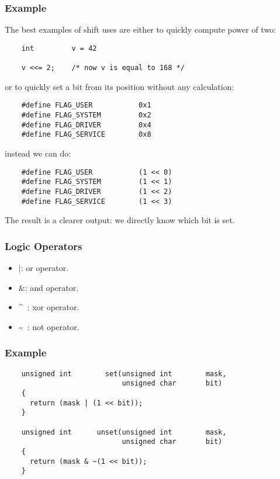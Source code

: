
\begin{frame}[containsverbatim]
  \frametitle{Example}

  The best examples of shift uses are either to quickly compute power of two:

  \begin{verbatim}
    int         v = 42

    v <<= 2;    /* now v is equal to 168 */
  \end{verbatim}

  or to quickly set a bit from its position without any calculation:

  \begin{verbatim}
    #define FLAG_USER           0x1
    #define FLAG_SYSTEM         0x2
    #define FLAG_DRIVER         0x4
    #define FLAG_SERVICE        0x8
  \end{verbatim}

  instead we can do:

  \begin{verbatim}
    #define FLAG_USER           (1 << 0)
    #define FLAG_SYSTEM         (1 << 1)
    #define FLAG_DRIVER         (1 << 2)
    #define FLAG_SERVICE        (1 << 3)
  \end{verbatim}

  The result is a clearer output: we directly know which bit is set.
\end{frame}


\begin{frame}
  \frametitle{Logic Operators}

  \begin{itemize}[<+->]
    \item
      $|$: or operator.
    \item
      \&: and operator.
    \item
      \^~: xor operator.
    \item
      \~~: not operator.
  \end{itemize}
\end{frame}


\begin{frame}[containsverbatim]
  \frametitle{Example}

  \begin{verbatim}
    unsigned int        set(unsigned int        mask,
                            unsigned char       bit)
    {
      return (mask | (1 << bit));
    }

    unsigned int      unset(unsigned int        mask,
                            unsigned char       bit)
    {
      return (mask & ~(1 << bit));
    }
  \end{verbatim}
\end{frame}

